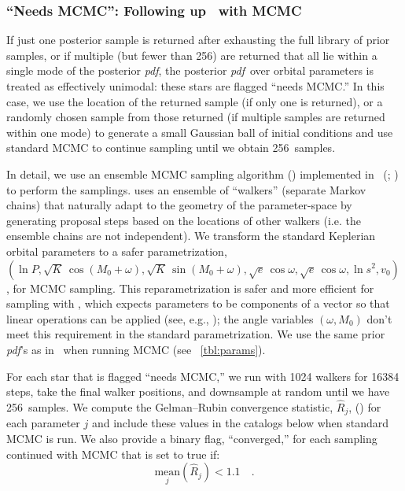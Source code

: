 \documentclass[modern, letterpaper]{aastex62}
\newcommand{\thejoker}{\project{The~Joker}}
\newcommand{\pdf}{\textit{pdf}}
\newcommand{\nposterior}{256}
\begin{document}
\subsubsection{``Needs MCMC'': Following up \thejoker\ with MCMC}
\label{sec:mcmc}

If just one posterior sample is returned after exhausting the full library of
prior samples, or if multiple (but fewer than \nposterior) are returned that all
lie within a single mode of the posterior \pdf, the posterior \pdf\ over orbital
parameters is treated as effectively unimodal: these stars are flagged ``needs
MCMC.''
In this case, we use the location of the returned sample (if only one is
returned), or a randomly chosen sample from those returned (if multiple samples
are returned within one mode) to generate a small Gaussian ball of initial
conditions and use standard MCMC to continue sampling until we obtain
\nposterior\ samples.

In detail, we use an ensemble MCMC sampling algorithm (\citealt{Goodman:2010})
implemented in \python\ (; \citealt{Foreman-Mackey:2013}) to
perform the samplings.
 uses an ensemble of ``walkers'' (separate Markov chains) that
naturally adapt to the geometry of the parameter-space by generating proposal
steps based on the locations of other walkers (i.e. the ensemble chains are not
independent).
We transform the standard Keplerian orbital parameters to a safer
parametrization, $(\ln P, \sqrt{K}\,\cos (M_0 + \omega), \sqrt{K}\,\sin (M_0 +
\omega), \sqrt{e}\,\cos \omega, \sqrt{e}\,\cos \omega, \ln s^2, v_0)$, for MCMC
sampling.
This reparametrization is safer and more efficient for sampling with
, which expects parameters to be components of a vector so that
linear operations can be applied (see, e.g., \citealt{Hogg:2017}); the angle
variables $(\omega, M_0)$ don't meet this requirement in the standard
parametrization.
We use the same prior \pdf 's as in \thejoker\ when running MCMC (see
\tablename~\ref{tbl:params}).

For each star that is flagged ``needs MCMC,'' we run  with 1024
walkers for 16384 steps, take the final walker positions, and downsample at
random until we have \nposterior\ samples.
We compute the Gelman--Rubin convergence statistic, $\hat{R}_j$,
(\citealt{Gelman:1992}) for each parameter $j$ and include these values in the
catalogs below when standard MCMC is run.
We also provide a binary flag, ``converged,'' for each sampling continued with
MCMC that is set to true if:
\begin{equation}
\underset{j}{\textrm{mean}}\left(\hat{R}_j\right) < 1.1 \quad .
\end{equation}
\end{document}
